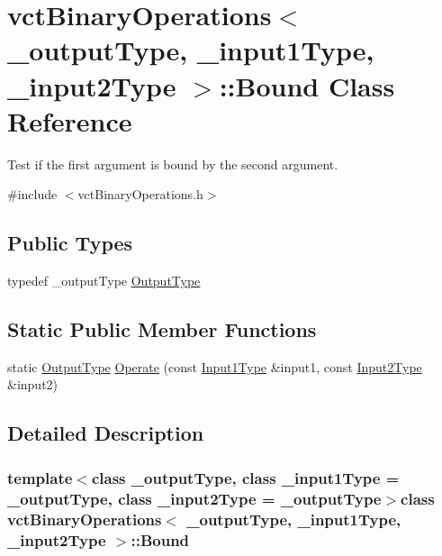 \hypertarget{classvct_binary_operations_1_1_bound}{}\section{vct\+Binary\+Operations$<$ \+\_\+output\+Type, \+\_\+input1\+Type, \+\_\+input2\+Type $>$\+:\+:Bound Class Reference}
\label{classvct_binary_operations_1_1_bound}


Test if the first argument is bound by the second argument.  




{\ttfamily \#include $<$vct\+Binary\+Operations.\+h$>$}

\subsection*{Public Types}
\begin{DoxyCompactItemize}
\item 
typedef \+\_\+output\+Type \hyperlink{classvct_binary_operations_1_1_bound_a5a4b69346c1fd30825140a406c6bb079}{Output\+Type}
\end{DoxyCompactItemize}
\subsection*{Static Public Member Functions}
\begin{DoxyCompactItemize}
\item 
static \hyperlink{classvct_binary_operations_1_1_bound_a5a4b69346c1fd30825140a406c6bb079}{Output\+Type} \hyperlink{classvct_binary_operations_1_1_bound_ae88f2288f191c8304144c01a64c324f1}{Operate} (const \hyperlink{classvct_binary_operations_a5e56a66a012d6a28c539a08a0021c45e}{Input1\+Type} \&input1, const \hyperlink{classvct_binary_operations_a929119af557a04a16b4d854981e49e1b}{Input2\+Type} \&input2)
\end{DoxyCompactItemize}


\subsection{Detailed Description}
\subsubsection*{template$<$class \+\_\+output\+Type, class \+\_\+input1\+Type = \+\_\+output\+Type, class \+\_\+input2\+Type = \+\_\+output\+Type$>$class vct\+Binary\+Operations$<$ \+\_\+output\+Type, \+\_\+input1\+Type, \+\_\+input2\+Type $>$\+::\+Bound}

